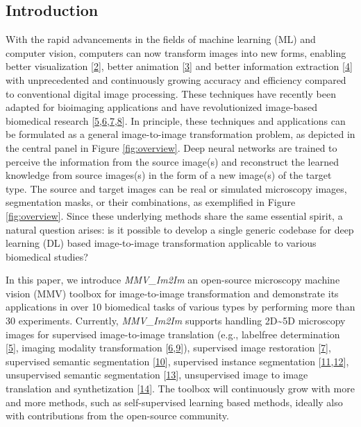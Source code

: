 \hypertarget{introduction}{%
\subsection{Introduction}\label{introduction}}

With the rapid advancements in the fields of machine learning (ML) and computer vision, computers can now transform images into new forms, enabling better visualization {[}\protect\hyperlink{ref-1O0bopKD}{2}{]}, better animation {[}\protect\hyperlink{ref-LxlUp436}{3}{]} and better information extraction {[}\protect\hyperlink{ref-11chATuF4}{4}{]} with unprecedented and continuously growing accuracy and efficiency compared to conventional digital image processing. These techniques have recently been adapted for bioimaging applications and have revolutionized image-based biomedical research {[}\protect\hyperlink{ref-Yq8wZ6hc}{5},\protect\hyperlink{ref-WwenuBHa}{6},\protect\hyperlink{ref-wcCVn8av}{7},\protect\hyperlink{ref-xPgDok51}{8}{]}. In principle, these techniques and applications can be formulated as a general image-to-image transformation problem, as depicted in the central panel in Figure \ref{fig:overview}. Deep neural networks are trained to perceive the information from the source image(s) and reconstruct the learned knowledge from source images(s) in the form of a new image(s) of the target type. The source and target images can be real or simulated microscopy images, segmentation masks, or their combinations, as exemplified in Figure \ref{fig:overview}. Since these underlying methods share the same essential spirit, a natural question arises: is it possible to develop a single generic codebase for deep learning (DL) based image-to-image transformation applicable to various biomedical studies?

In this paper, we introduce \emph{MMV\_Im2Im} an open-source microscopy machine vision (MMV) toolbox for image-to-image transformation and demonstrate its applications in over 10 biomedical tasks of various types by performing more than 30 experiments. Currently, \emph{MMV\_Im2Im} supports handling 2D\textasciitilde5D microscopy images for supervised image-to-image translation (e.g., labelfree determination {[}\protect\hyperlink{ref-Yq8wZ6hc}{5}{]}, imaging modality transformation {[}\protect\hyperlink{ref-WwenuBHa}{6},\protect\hyperlink{ref-UEBDZ3tI}{9}{]}), supervised image restoration {[}\protect\hyperlink{ref-wcCVn8av}{7}{]}, supervised semantic segmentation {[}\protect\hyperlink{ref-TutLhFSz}{10}{]}, supervised instance segmentation {[}\protect\hyperlink{ref-K2ugNcVa}{11},\protect\hyperlink{ref-QmYuUQ5K}{12}{]}, unsupervised semantic segmentation {[}\protect\hyperlink{ref-RuFP3CS3}{13}{]}, unsupervised image to image translation and synthetization {[}\protect\hyperlink{ref-6wtIu4QY}{14}{]}. The toolbox will continuously grow with more and more methods, such as self-supervised learning based methods, ideally also with contributions from the open-source community.

